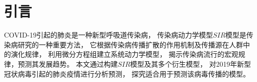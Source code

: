 \section{引言}
COVID-19引起的肺炎是一种新型呼吸道传染病，
传染病动力学模型$SIR$模型是传染病研究的一种重要方法\cite{应用SEIR模型预测2009年甲型H1N1流感流行趋势}，
它根据传染病传播扩散的作用机制及传播源在人群中的演化规律，
利用微分方程组建立系统动力学模型，
揭示传染病流行的宏观规律，预测其发展趋势。
本文通过构建$SIR$模型及其多个衍生模型，
对2019年新型冠状病毒引起的肺炎疫情进行分析预测，
探究适合用于预测该病毒传播的模型。